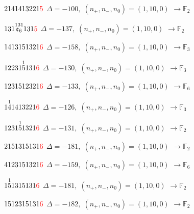 \documentclass[10pt]{article}
\begin{document}
$2141413221\textcolor{red}{5}$ \quad $\Delta=-100,\; (n_+,n_-,n_0)=(1,10,0)$ \quad $\to \mathbb{F}_{2}$

\smallskip

$131\overset{131}{\mathfrak{e}_6}131\textcolor{red}{5}$ \quad $\Delta=-137,\; (n_+,n_-,n_0)=(1,10,0)$ \quad $\to \mathbb{F}_{2}$

\smallskip

$1413151321\textcolor{red}{6}$ \quad $\Delta=-158,\; (n_+,n_-,n_0)=(1,10,0)$ \quad $\to \mathbb{F}_{3}$

\smallskip

$12231\overset{1}{5}131\textcolor{red}{6}$ \quad $\Delta=-130,\; (n_+,n_-,n_0)=(1,10,0)$ \quad $\to \mathbb{F}_{3}$

\smallskip

$1231512321\textcolor{red}{6}$ \quad $\Delta=-133,\; (n_+,n_-,n_0)=(1,10,0)$ \quad $\to \mathbb{F}_{6}$

\smallskip

$1\overset{1}{4}1413221\textcolor{red}{6}$ \quad $\Delta=-126,\; (n_+,n_-,n_0)=(1,10,0)$ \quad $\to \mathbb{F}_{3}$

\smallskip

$1231\overset{1}{5}1321\textcolor{red}{6}$ \quad $\Delta=-131,\; (n_+,n_-,n_0)=(1,10,0)$ \quad $\to \mathbb{F}_{2}$

\smallskip

$2151315131\textcolor{red}{6}$ \quad $\Delta=-181,\; (n_+,n_-,n_0)=(1,10,0)$ \quad $\to \mathbb{F}_{2}$

\smallskip

$4123151321\textcolor{red}{6}$ \quad $\Delta=-159,\; (n_+,n_-,n_0)=(1,10,0)$ \quad $\to \mathbb{F}_{6}$

\smallskip

$1\overset{1}{5}1315131\textcolor{red}{6}$ \quad $\Delta=-181,\; (n_+,n_-,n_0)=(1,10,0)$ \quad $\to \mathbb{F}_{2}$

\smallskip

$1512315131\textcolor{red}{6}$ \quad $\Delta=-182,\; (n_+,n_-,n_0)=(1,10,0)$ \quad $\to \mathbb{F}_{2}$
\end{document}
